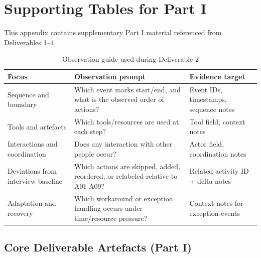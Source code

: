 \section{Supporting Tables for Part I}
\label{app:part1_supporting}

This appendix contains supplementary Part I material referenced from Deliverables 1--4.

\begin{table}[H]
\centering
\footnotesize
\caption{Observation guide used during Deliverable 2}
\label{tab:d2_observation_guide}
\begin{tabularx}{\textwidth}{
>{\raggedright\arraybackslash}p{}
>{\raggedright\arraybackslash}X
>{\raggedright\arraybackslash}p{}
}
\toprule
Focus & Observation prompt & Evidence target \\
\midrule
Sequence and boundary & Which event marks start/end, and what is the observed order of actions? & Event IDs, timestamps, sequence notes \\
Tools and artefacts & Which tools/resources are used at each step? & Tool field, context notes \\
Interactions and coordination & Does any interaction with other people occur? & Actor field, coordination notes \\
Deviations from interview baseline & Which actions are skipped, added, reordered, or relabeled relative to A01-A09? & Related activity ID + delta notes \\
Adaptation and recovery & Which workaround or exception handling occurs under time/resource pressure? & Context notes for exception events \\
\bottomrule
\end{tabularx}
\end{table}

\subsection{Core Deliverable Artefacts (Part I)}
\label{app:part1_core_artefacts}

